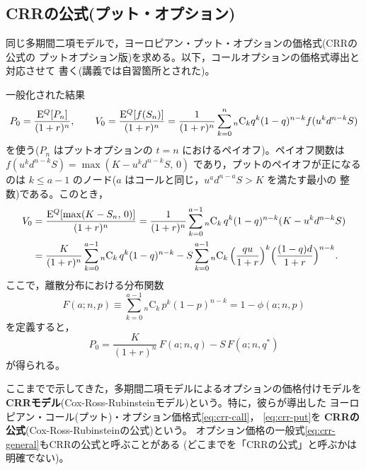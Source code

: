 \subsection{CRRの公式(プット・オプション)}

同じ多期間二項モデルで，ヨーロピアン・プット・オプションの価格式(CRRの公式の
プットオプション版)を求める。以下，コールオプションの価格式導出と対応させて
書く(講義では自習箇所とされた)。

一般化された結果
\begin{equation}
P_0 = \frac{\mathrm{E}^Q[P_n]}{(1+r)^n},\qquad
V_0 = \frac{\mathrm{E}^Q[f(S_n)]}{(1+r)^n}
= \frac{1}{(1+r)^n}\sum_{k=0}^{n}{}_n\mathrm{C}_k q^k(1-q)^{n-k}f(u^kd^{n-k}S)
\end{equation}
を使う($P_n$ はプットオプションの $t=n$ におけるペイオフ)。ペイオフ関数は
$f(u^kd^{n-k}S) = \max(K - u^kd^{n-k}S,\,0)$ であり，プットのペイオフが正になる
のは $k \leq a-1$ のノード($a$ はコールと同じ，$u^ad^{n-a}S>K$ を満たす最小の
整数)である。このとき，
\begin{align}
V_0 &= \frac{\mathrm{E}^Q[\max(K-S_n,\,0)]}{(1+r)^n}
= \frac{1}{(1+r)^n}\sum_{k=0}^{a-1}{}_n\mathrm{C}_k\,q^k(1-q)^{n-k}
(K - u^kd^{n-k}S)\notag\\
&= \frac{K}{(1+r)^n}\sum_{k=0}^{a-1}{}_n\mathrm{C}_k\,q^k(1-q)^{n-k}
- S\sum_{k=0}^{a-1}{}_n\mathrm{C}_k\,
\Bigl(\frac{qu}{1+r}\Bigr)^k\Bigl(\frac{(1-q)d}{1+r}\Bigr)^{n-k}.
\end{align}
ここで，離散分布における分布関数
\begin{equation}
F(a; n, p) \equiv \sum_{k=0}^{a-1}{}_n\mathrm{C}_k\,p^k(1-p)^{n-k}
= 1 - \phi(a; n, p)
\end{equation}
を定義すると，
\begin{equation}
\boxed{\;
P_0 = \frac{K}{(1+r)^n}\,F(a; n, q) - S\,F(a; n, q^*)
\;}
\label{eq:crr-put}
\end{equation}
が得られる。

\begin{definition}[CRRモデルとCRRの公式]
ここまでで示してきた，多期間二項モデルによるオプションの価格付けモデルを
\textbf{CRRモデル}(Cox-Ross-Rubinsteinモデル)という。特に，彼らが導出した
ヨーロピアン・コール(プット)・オプション価格式\eqref{eq:crr-call}，
\eqref{eq:crr-put}を \textbf{CRRの公式}(Cox-Ross-Rubinsteinの公式)という。
オプション価格の一般式\eqref{eq:crr-general}もCRRの公式と呼ぶことがある
(どこまでを「CRRの公式」と呼ぶかは明確でない)。
\end{definition}

\vspace{18pt}

